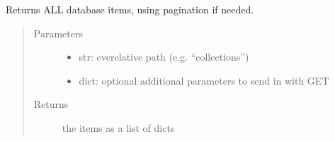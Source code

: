 \documentclass[letterpaper,10pt,english]{sphinxmanual}
\begin{document}
\begin{fulllineitems}
\label{\detokenize{autoapi/pine/backend/data/service/index:pine.backend.data.service.get_all_items}}
Returns ALL database items, using pagination if needed.
\begin{quote}\begin{description}
\item[{Parameters}] \leavevmode\begin{itemize}
\item {} 
 \textendash{} str: eve\sphinxhyphen{}relative path (e.g. “collections”)

\item {} 
 \textendash{} dict: optional additional parameters to send in with GET

\end{itemize}

\item[{Returns}] \leavevmode
the items as a list of dicts

\end{description}\end{quote}

\end{fulllineitems}


\begin{fulllineitems}
\label{\detokenize{autoapi/pine/backend/data/service/index:pine.backend.data.service.convert_response}}
\end{fulllineitems}


\begin{fulllineitems}
\label{\detokenize{autoapi/pine/backend/data/service/index:pine.backend.data.service.remove_eve_fields}}
\end{fulllineitems}
\end{document}
